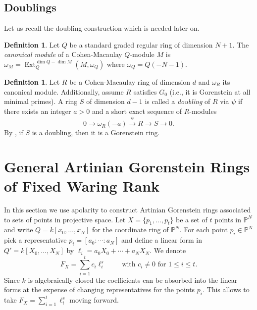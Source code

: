 \documentclass[reqno]{amsart}
\DeclareMathOperator{\Ext}{Ext}
\renewcommand{\P}{\mathbb{P}}
\theoremstyle{plain} %
\theoremstyle{definition}
\newtheorem{definition}[theorem]{Definition}
\theoremstyle{remark}
\begin{document}
\subsection{Doublings} 


Let us recall the doubling construction which is needed later on.


\begin{definition}
Let $Q$ be a standard graded regular ring of dimension $N+1$. The \emph{canonical module} of a Cohen-Macaulay $Q$-module $M$ is $\omega_M = \Ext^{\dim Q - \dim M}_Q (M, \omega_Q)$ where $\omega_Q=Q(-N-1)$. 
\end{definition}



\begin{definition}\label{doubling}  
Let $R$ be a Cohen-Macaulay ring of dimension $d$ and $\omega_R$ its canonical module. Additionally, assume $R$ satisfies $G_0$ (i.e., it is Gorenstein at all minimal
primes). A ring $S$ of dimension $d-1$ is called a {\em doubling} of $R$ via $\psi$ if there exists  an integer $a>0$ and a short exact sequence of $R$-modules
\begin{equation}\label{eq:doubling}
0 \rightarrow \omega_{R}(-a)\stackrel{\psi}{\rightarrow} R \rightarrow S\rightarrow 0.
\end{equation}
By \cite[Proposition 3.3.18]{BH}, if $S$ is a doubling, then it is a Gorenstein ring. 


\end{definition}

\section{General Artinian Gorenstein Rings of Fixed Waring Rank}

In this section we use apolarity to construct Artinian Gorenstein rings associated to sets of points in projective space.
Let $X=\{p_1,\ldots,p_t\}$ be a set of $t$ points in $\P^N$ and write $Q=k[x_0,\ldots,x_N]$ for the coordinate ring of $\P^N$.
For each point $p_i\in \P^N$ pick a representative $p_i=[a_0:\cdots : a_N]$ and define a linear form in $Q'=k[X_0,\ldots,X_N]$ by
$\ell_i=a_0X_0+\cdots +a_NX_N$. 
We denote
\begin{equation}\label{eq: FX}
F_X=\sum_{i=1}^t c_i \ell_i^{s} \qquad \text{ with } c_i\neq 0 \text{ for } 1\leq i\leq t.
\end{equation}
Since $k$ is algebraically closed the coefficients can be absorbed into the linear forms at the expense of changing representatives for the points $p_i$. This allows to take $F_X=\sum_{i=1}^t \ell_i^{s}$ moving forward.
\end{document}
